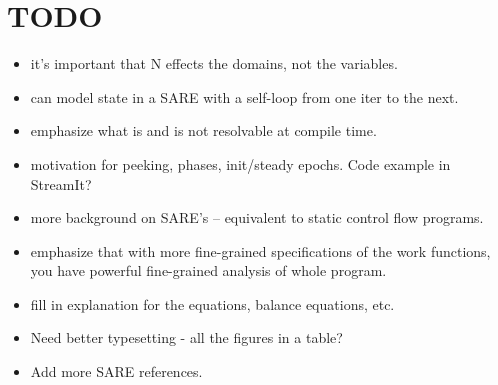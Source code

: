 \section{TODO}

\begin{itemize}

\item it's important that N effects the domains, not the variables.

\item can model state in a SARE with a self-loop from one iter to the next.

\item emphasize what is and is not resolvable at compile time.

\item motivation for peeking, phases, init/steady epochs.  Code
example in StreamIt?

\item more background on SARE's -- equivalent to static control flow
programs.

\item emphasize that with more fine-grained specifications of the work
functions, you have powerful fine-grained analysis of whole program.

\item fill in explanation for the equations, balance equations, etc.

\item Need better typesetting - all the figures in a table?

\item Add more SARE references.

\end{itemize}

